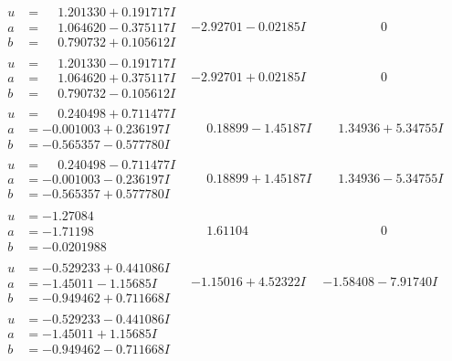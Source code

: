 \documentclass[1p]{elsarticle_modified}
\theoremstyle{definition}
\begin{document}
$$\begin{array}{c|c|c}
\begin{aligned}
u &= \phantom{-}1.201330 + 0.191717 I \\
a &= \phantom{-}1.064620 - 0.375117 I \\
b &= \phantom{-}0.790732 + 0.105612 I\end{aligned}
 & -2.92701 - 0.02185 I & \phantom{-0.000000 } 0 \\ \hline\begin{aligned}
u &= \phantom{-}1.201330 - 0.191717 I \\
a &= \phantom{-}1.064620 + 0.375117 I \\
b &= \phantom{-}0.790732 - 0.105612 I\end{aligned}
 & -2.92701 + 0.02185 I & \phantom{-0.000000 } 0 \\ \hline\begin{aligned}
u &= \phantom{-}0.240498 + 0.711477 I \\
a &= -0.001003 + 0.236197 I \\
b &= -0.565357 - 0.577780 I\end{aligned}
 & \phantom{-}0.18899 - 1.45187 I & \phantom{-}1.34936 + 5.34755 I \\ \hline\begin{aligned}
u &= \phantom{-}0.240498 - 0.711477 I \\
a &= -0.001003 - 0.236197 I \\
b &= -0.565357 + 0.577780 I\end{aligned}
 & \phantom{-}0.18899 + 1.45187 I & \phantom{-}1.34936 - 5.34755 I \\ \hline\begin{aligned}
u &= -1.27084\phantom{ +0.000000I} \\
a &= -1.71198\phantom{ +0.000000I} \\
b &= -0.0201988\phantom{ +0.000000I}\end{aligned}
 & \phantom{-}1.61104\phantom{ +0.000000I} & \phantom{-0.000000 } 0 \\ \hline\begin{aligned}
u &= -0.529233 + 0.441086 I \\
a &= -1.45011 - 1.15685 I \\
b &= -0.949462 + 0.711668 I\end{aligned}
 & -1.15016 + 4.52322 I & -1.58408 - 7.91740 I \\ \hline\begin{aligned}
u &= -0.529233 - 0.441086 I \\
a &= -1.45011 + 1.15685 I \\
b &= -0.949462 - 0.711668 I\end{aligned}

\end{array}$$
\end{document}
